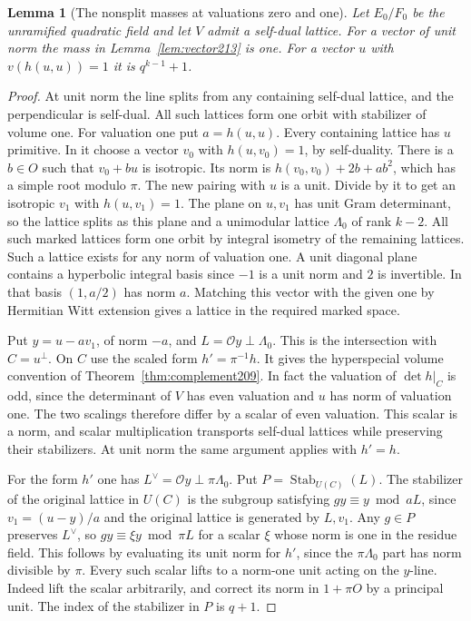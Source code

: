 \documentclass[a4paper,11pt]{article}
\newtheorem{lemma}[proposition]{Lemma}
\theoremstyle{definition}
\theoremstyle{remark}
\numberwithin{equation}{section}
\begin{document}
\begin{lemma}[The nonsplit masses at valuations zero and one]
\leavevmode\label{lem:base213}
Let \(E_0/F_0\) be the unramified quadratic field and let \(V\)
admit a self-dual lattice. For a vector of unit norm the mass
in Lemma~\ref{lem:vector213} is one. For a vector \(u\) with
\(v(h(u,u))=1\) it is \(q^{k-1}+1\).
\end{lemma}
\begin{proof}
At unit norm the line splits from any containing self-dual lattice,
and the perpendicular is self-dual. All such lattices form one
orbit with stabilizer of volume one. For valuation one put
\(a=h(u,u)\). Every containing lattice has \(u\) primitive.
In it choose a vector \(v_0\) with \(h(u,v_0)=1\), by self-duality.
There is a \(b\in O\) such that \(v_0+bu\) is isotropic. Its norm
is \(h(v_0,v_0)+2b+ab^2\), which has a simple root modulo \(\pi\).
The new pairing with \(u\) is a unit. Divide by it to get an
isotropic \(v_1\) with \(h(u,v_1)=1\). The plane on \(u,v_1\)
has unit Gram determinant, so the lattice splits as this plane
and a unimodular lattice \(\Lambda_0\) of rank \(k-2\).
All such marked lattices form one orbit by integral isometry
of the remaining lattices. Such a lattice exists for any norm
of valuation one. A unit diagonal plane contains a hyperbolic
integral basis since \(-1\) is a unit norm and \(2\) is invertible.
In that basis \((1,a/2)\) has norm \(a\). Matching this vector
with the given one by Hermitian Witt extension gives a lattice
in the required marked space.

Put \(y=u-av_1\), of norm \(-a\), and \(L=\mathcal O y\perp\Lambda_0\).
This is the intersection with \(C=u^\perp\). On \(C\) use the
scaled form \(h'=\pi^{-1}h\). It gives the hyperspecial volume
convention of Theorem~\ref{thm:complement209}. In fact the
valuation of \(\det h|_C\) is odd, since the determinant of \(V\)
has even valuation and \(u\) has norm of valuation one. The two
scalings therefore differ by a scalar of even valuation. This
scalar is a norm, and scalar multiplication transports self-dual
lattices while preserving their stabilizers. At unit norm the
same argument applies with \(h'=h\).

For the form \(h'\) one has \(L^\vee=\mathcal O y\perp\pi\Lambda_0\).
Put \(P=\operatorname{Stab}_{U(C)}(L)\). The stabilizer of the
original lattice in \(U(C)\) is the subgroup satisfying
\(g y\equiv y\bmod aL\), since \(v_1=(u-y)/a\) and
the original lattice is generated by \(L,v_1\). Any \(g\in P\)
preserves \(L^\vee\), so \(gy\equiv \xi y\bmod\pi L\) for a scalar
\(\xi\) whose norm is one in the residue field. This follows by
evaluating its unit norm for \(h'\), since the \(\pi\Lambda_0\)
part has norm divisible by \(\pi\). Every such scalar lifts to a
norm-one unit acting on the \(y\)-line. Indeed lift the scalar
arbitrarily, and correct its norm in \(1+\pi O\) by a principal
unit. The index of the stabilizer in \(P\) is \(q+1\).


\end{proof}
\end{document}
